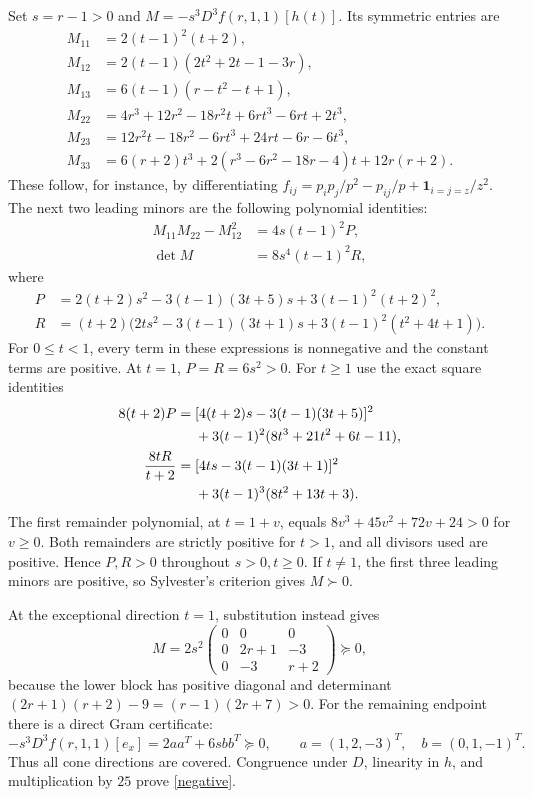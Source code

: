 \documentclass[11pt]{article}
\begin{document}
Set $s=r-1>0$ and $M=-s^3D^3f(r,1,1)[h(t)]$. Its symmetric entries are
\begin{align*}
 M_{11}&=2(t-1)^2(t+2),\\
 M_{12}&=2(t-1)(2t^2+2t-1-3r),\\
 M_{13}&=6(t-1)(r-t^2-t+1),\\
 M_{22}&=4r^3+12r^2-18r^2t+6rt^3-6rt+2t^3,\\
 M_{23}&=12r^2t-18r^2-6rt^3+24rt-6r-6t^3,\\
 M_{33}&=6(r+2)t^3+2(r^3-6r^2-18r-4)t+12r(r+2).
\end{align*}
These follow, for instance, by differentiating
$f_{ij}=p_ip_j/p^2-p_{ij}/p+\mathbf1_{i=j=z}/z^2$.
The next two leading minors are the following polynomial identities:
\begin{align}
 M_{11}M_{22}-M_{12}^2&=4s(t-1)^2P,\label{minor}\\
 \det M&=8s^4(t-1)^2R,\label{det}
\end{align}
where
\begin{align*}
 P&=2(t+2)s^2-3(t-1)(3t+5)s+3(t-1)^2(t+2)^2,\\
 R&=(t+2)\bigl(2ts^2-3(t-1)(3t+1)s
             +3(t-1)^2(t^2+4t+1)\bigr).
\end{align*}
For $0\leq t<1$, every term in these expressions is nonnegative and
the constant terms are positive. At $t=1$, $P=R=6s^2>0$.
For $t\geq1$ use the exact square identities
\begin{align}
 8(t+2)P={}&[4(t+2)s-3(t-1)(3t+5)]^2\notag\\
          &+3(t-1)^2(8t^3+21t^2+6t-11),\label{squarep}\\
 \frac{8tR}{t+2}={}&[4ts-3(t-1)(3t+1)]^2\notag\\
          &+3(t-1)^3(8t^2+13t+3).\label{squarer}
\end{align}
The first remainder polynomial, at $t=1+v$, equals
$8v^3+45v^2+72v+24>0$ for $v\geq0$. Both remainders are strictly
positive for $t>1$, and all divisors used are positive. Hence $P,R>0$
throughout $s>0,t\geq0$. If $t\ne1$, the first three leading minors
are positive, so Sylvester's criterion gives $M\succ0$.

At the exceptional direction $t=1$, substitution instead gives
\[
 M=2s^2\begin{pmatrix}0&0&0\\0&2r+1&-3\\0&-3&r+2\end{pmatrix}\succeq0,
\]
because the lower block has positive diagonal and determinant
$(2r+1)(r+2)-9=(r-1)(2r+7)>0$.
For the remaining endpoint there is a direct Gram certificate:
\[
 -s^3D^3f(r,1,1)[e_x]=2aa^T+6sbb^T\succeq0,\qquad
 a=(1,2,-3)^T,\quad b=(0,1,-1)^T.
\]
Thus all cone directions are covered. Congruence under $D$, linearity
in $h$, and multiplication by $25$ prove \eqref{negative}.
\end{document}

